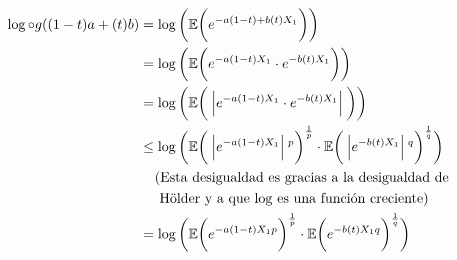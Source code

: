     \begin{align}
        \log\circ g ((1-t)a + (t)b)     &=       \log\bigg( \E\bigg(e^{-a(1-t) + b(t) X_1}\bigg) \bigg)                              \\
                                        &=       \log\bigg( \E\bigg(e^{-a(1-t) X_1} \cdot e^{-b(t) X_1}\bigg) \bigg)                 \\
                                        &=       \log\bigg( \E\bigg(\abs{e^{-a(1-t) X_1} \cdot e^{-b(t) X_1}}\bigg) \bigg)           \\
                                        &\leq    \log\bigg(
                                                            \E
                                                                \bigg(
                                                                    \abs{e^{-a(1-t) X_1}}^p
                                                                \bigg)^{\frac{1}{p}} 
                                                        \cdot 
                                                            \E
                                                                \bigg(
                                                                    \abs{e^{-b(t) X_1}}^q
                                                                \bigg)^\frac{1}{q}
                                                    \bigg)                                                                          \\
                                        &\;\;\;\;\mbox{(Esta desigualdad es gracias a la desigualdad de }                           \\
                                        &\;\;\;\;\mbox{ Hölder y a que $\log$ es una función creciente)}                            \\
                                        &=      \log\bigg( 
                                                            \E
                                                                \bigg(
                                                                    e^{-a(1-t) X_1 p}
                                                                \bigg)^{\frac{1}{p}} 
                                                        \cdot     
                                                            \E
                                                                \bigg(
                                                                    e^{-b(t) X_1 q}
                                                                \bigg)^\frac{1}{q}
                                                     \bigg)                                                                         \\

\end{align}
